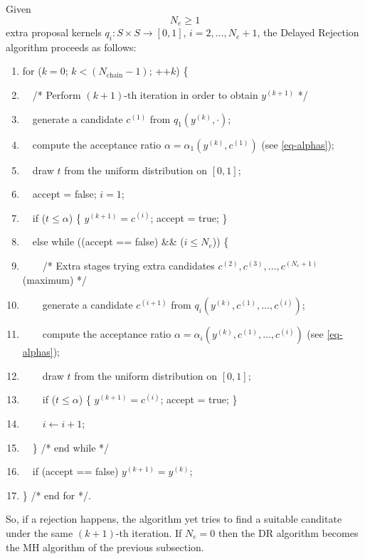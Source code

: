 Given
\begin{equation}\label{eq-Ne}
N_e\geqslant 1
\end{equation}
extra proposal kernels $q_i:S\times S\rightarrow [0,1]$, $i=2,\ldots,N_e+1$,
the Delayed Rejection algorithm proceeds as follows:
\begin{enumerate}
\item for ($k=0$; $k < (N_{\mbox{chain}}-1)$; ++$k$) \{
\item $\quad$/* Perform $(k+1)$-th iteration in order to obtain $y^{(k+1)}$ */
\item $\quad$generate a candidate $c^{(1)}$ from $q_1(y^{(k)},\cdot)$;
\item $\quad$compute the acceptance ratio $\alpha=\alpha_1(y^{(k)},c^{(1)})$ (see \eqref{eq-alphas});
\item $\quad$draw $t$ from the uniform distribution on $[0,1]$;
\item $\quad$accept = false; $i=1$;
\item $\quad$if ($t\leqslant \alpha$) \{ $y^{(k+1)}=c^{(i)}$; accept = true; \}
\item $\quad$else while ((accept == false) \&\& ($i\leqslant N_e$)) \{
\item $\quad\quad$/* Extra stages trying extra candidates $c^{(2)},c^{(3)},\ldots,c^{(N_e+1)}$ (maximum) */
\item $\quad\quad$generate a candidate $c^{(i+1)}$ from $q_i(y^{(k)},c^{(1)},\ldots,c^{(i)})$;
\item $\quad\quad$compute the acceptance ratio $\alpha=\alpha_i(y^{(k)},c^{(1)},\ldots,c^{(i)})$ (see \eqref{eq-alphas});
\item $\quad\quad$draw $t$ from the uniform distribution on $[0,1]$;
\item $\quad\quad$if ($t\leqslant \alpha$) \{ $y^{(k+1)}=c^{(i)}$; accept = true; \}
\item $\quad\quad$$i\leftarrow i+1$;
\item $\quad$\} /* end while */
\item $\quad$if (accept == false) $y^{(k+1)}=y^{(k)}$;
\item \} /* end for */.
\end{enumerate}
So, if a rejection happens, the algorithm yet tries to find a suitable canditate under the same $(k+1)$-th iteration.
If $N_e=0$ then the DR algorithm becomes the MH algorithm of the previous subsection.


